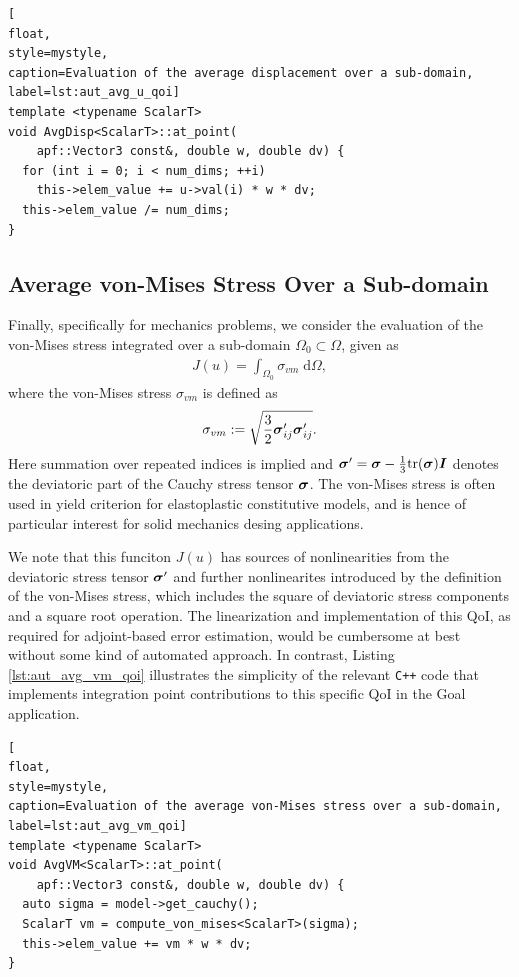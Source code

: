\begin{lstlisting}[
float,
style=mystyle,
caption=Evaluation of the average displacement over a sub-domain,
label=lst:aut_avg_u_qoi]
template <typename ScalarT>
void AvgDisp<ScalarT>::at_point(
    apf::Vector3 const&, double w, double dv) {
  for (int i = 0; i < num_dims; ++i)
    this->elem_value += u->val(i) * w * dv;
  this->elem_value /= num_dims;
}
\end{lstlisting}

\subsection{Average von-Mises Stress Over a Sub-domain}

Finally, specifically for mechanics problems, we consider the evaluation of
the von-Mises stress integrated over a sub-domain $\Omega_0 \subset \Omega$,
given as
%
\begin{gather}
J(u) = \int_{\Omega_0} \sigma_{vm} \; \text{d} \Omega,
\label{eq:aut_avg_vm_qoi}
\end{gather}
%
where the von-Mises stress $\sigma_{vm}$ is defined as
%
\begin{gather}
\sigma_{vm} := \sqrt{\frac32 \boldsymbol{\sigma}'_{ij} \boldsymbol{\sigma}'_{ij}}.
\label{eq:aut_vm_defn}
\end{gather}
%
Here summation over repeated indices is implied and
$\boldsymbol{\sigma}' = \boldsymbol{\sigma} - \frac13 \text{tr}(\boldsymbol{\sigma})\boldsymbol{I}$ denotes
the deviatoric part of the Cauchy stress tensor $\boldsymbol{\sigma}$. The von-Mises
stress is often used in yield criterion for elastoplastic constitutive models,
and is hence of particular interest for solid mechanics desing applications.

We note that this funciton $J(u)$ has sources of nonlinearities from the
deviatoric stress tensor $\boldsymbol{\sigma}'$ and further nonlinearites introduced
by the definition of the von-Mises stress, which includes the square of
deviatoric stress components and a square root operation. The linearization
and implementation of this QoI, as required for adjoint-based error
estimation, would be cumbersome at best without some kind of automated
approach. In contrast, Listing \ref{lst:aut_avg_vm_qoi}
illustrates the simplicity of the relevant
\texttt{C++} code that implements integration point contributions to this
specific QoI in the Goal application.

\begin{lstlisting}[
float,
style=mystyle,
caption=Evaluation of the average von-Mises stress over a sub-domain,
label=lst:aut_avg_vm_qoi]
template <typename ScalarT>
void AvgVM<ScalarT>::at_point(
    apf::Vector3 const&, double w, double dv) {
  auto sigma = model->get_cauchy();
  ScalarT vm = compute_von_mises<ScalarT>(sigma);
  this->elem_value += vm * w * dv;
}
\end{lstlisting}

